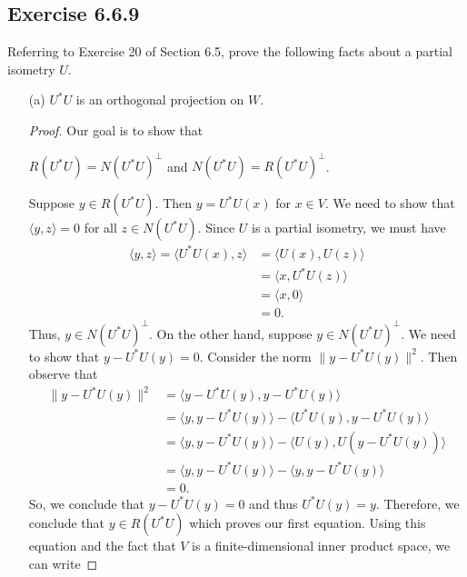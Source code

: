 \subsection*{Exercise 6.6.9} Referring to Exercise 20 of Section 6.5, prove the following facts about a partial isometry \( U \). 
\begin{enumerate}
    \item[(a)] \( U^{*} U  \) is an orthogonal projection on \( W  \).
        \begin{proof}
        Our goal is to show that 
        \begin{center}
           \( R(U^{*}U) = N(U^{*}U)^{\perp} \) and \( N(U^{*}U) = R(U^{*}U)^{\perp} \). 
        \end{center}
        Suppose \( y \in R(U^{*}U) \). Then \( y = U^{*}U(x) \) for \( x \in V  \). We need to show that \( \langle y , z  \rangle = 0  \) for all \( z \in N(U^{*}U) \). Since \( U  \) is a partial isometry, we must have
        \begin{align*}
            \langle y , z  \rangle = \langle U^{*}U(x) , z  \rangle  &= \langle U(x) , U(z) \rangle \\
                                                                     &= \langle x  ,  U^{*}U(z) \rangle \\
                                                                     &= \langle x  , 0  \rangle \\
                                                                     &= 0.
       \end{align*}
       Thus, \( y \in N(U^{*}U)^{\perp} \). On the other hand, suppose \( y \in N(U^{*}U)^{\perp}  \). We need to show that \( y  - U^{*}U(y) = 0 \). Consider the norm \( \| y - U^{*}U(y)\|^{2} \). Then observe that 
       \begin{align*}
           \|y - U^{*}U(y)\|^{2} &= \langle y - U^{*}U(y) ,  y - U^{*}U(y) \rangle   \\
                                 &= \langle y  ,  y - U^{*}U(y) \rangle - \langle U^{*}U(y) , y - U^{*}U(y) \rangle \\
                                 &= \langle y , y  - U^{*}U(y) \rangle - \langle U(y)  ,  U(y - U^{*}U(y)) \rangle \\ 
                                 &= \langle y , y - U^{*}U(y) \rangle - \langle y  , y - U^{*}U(y) \rangle \\
                                 &= 0.
       \end{align*}
       So, we conclude that \( y - U^{*}U(y) = 0  \) and thus \(  U^{*}U(y) = y  \). Therefore, we conclude that \( y \in R(U^{*}U) \) which proves our first equation. Using this equation and the fact that \( V  \) is a finite-dimensional inner product space, we can write

\end{proof}
\end{enumerate}
